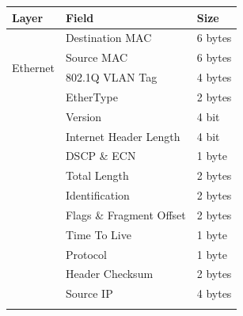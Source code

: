 \documentclass[twocolumn]{article}
\begin{document}
{
\vspace{1em}
\centering\small
\begin{tabular}{|l|l|l|}
  \hline
  \textbf{Layer}                & \textbf{Field}                             & \textbf{Size}               \\\hline
  \multirow{4}{4em}{Ethernet}
                                & Destination MAC                            & 6 bytes                     \\\hhline{|~|-|-|}
                                & Source MAC                                 & 6 bytes                     \\\hhline{|~|-|-|}
                                & \cellcolor{gray!20}802.1Q VLAN Tag         & \cellcolor{gray!20}4 bytes  \\\hhline{|~|-|-|}
                                & EtherType                                  & 2 bytes                     \\\hhline{|-|-|-|}
  \multirow{12}{4em}{IPv4}      & Version                                    & 4 bit                       \\\hhline{|~|-|-|}
                                & \cellcolor{green!10}Internet Header Length & \cellcolor{green!10}4 bit   \\\hhline{|~|-|-|}
                                & DSCP \& ECN                                & 1 byte                      \\\hhline{|~|-|-|}
                                & \cellcolor{green!10}Total Length           & \cellcolor{green!10}2 bytes \\\hhline{|~|-|-|}
                                & Identification                             & 2 bytes                     \\\hhline{|~|-|-|}
                                & Flags \& Fragment Offset                   & 2 bytes                     \\\hhline{|~|-|-|}
                                & Time To Live                               & 1 byte                      \\\hhline{|~|-|-|}
                                & Protocol                                   & 1 byte                      \\\hhline{|~|-|-|}
                                & \cellcolor{blue!10}Header Checksum         & \cellcolor{blue!10}2 bytes  \\\hhline{|~|-|-|}
                                & Source IP                                  & 4 bytes                     \\\hhline{|~|-|-|}

\end{tabular}}
\end{document}
